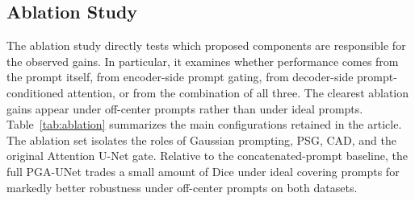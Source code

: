 \documentclass{ieeeaccess}
\begin{document}
\begin{table}
\caption{Efficiency comparison in the tested environment.}
\label{tab:efficiency}
\centering
\scriptsize
{}
\end{table}


\subsection{Ablation Study}
The ablation study directly tests which proposed components are responsible for the observed gains. In particular, it examines whether performance comes from the prompt itself, from encoder-side prompt gating, from decoder-side prompt-conditioned attention, or from the combination of all three. The clearest ablation gains appear under off-center prompts rather than under ideal prompts. Table~\ref{tab:ablation} summarizes the main configurations retained in the article. The ablation set isolates the roles of Gaussian prompting, PSG, CAD, and the original Attention U-Net gate. Relative to the concatenated-prompt baseline, the full PGA-UNet trades a small amount of Dice under ideal covering prompts for markedly better robustness under off-center prompts on both datasets.

\begin{table}
\caption{Summary ablation results (Dice) for the main prompt-aware configurations at $512\times512$.}
\label{tab:ablation}
\centering
\scriptsize
{}
\end{table}
\end{document}
